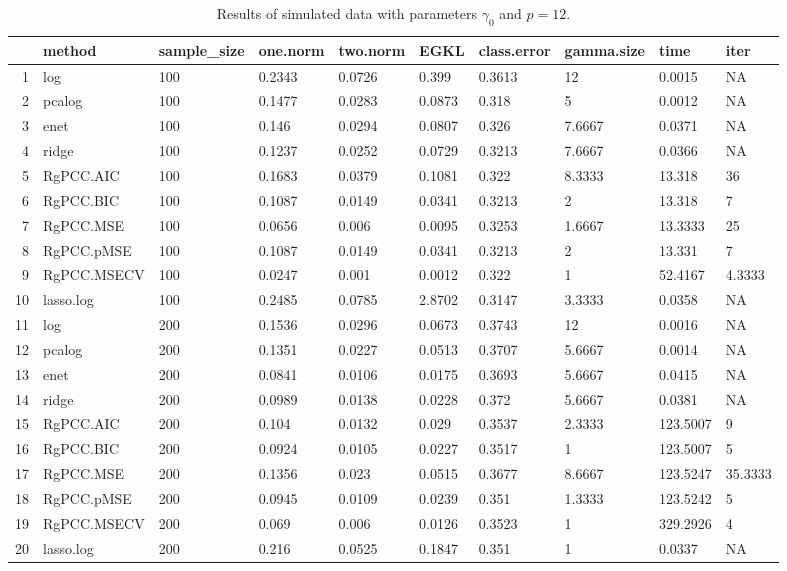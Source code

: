 \begin{table}[ht]
\centering
\begin{tabular}{rlllllllll}
  \hline
 & method & sample\_size & one.norm & two.norm & EGKL & class.error & gamma.size & time & iter \\ 
  \hline
1 & log & 100 & 0.2343 & 0.0726 & 0.399 & 0.3613 & 12 & 0.0015 & NA \\ 
  2 & pcalog & 100 & 0.1477 & 0.0283 & 0.0873 & 0.318 & 5 & 0.0012 & NA \\ 
  3 & enet & 100 & 0.146 & 0.0294 & 0.0807 & 0.326 & 7.6667 & 0.0371 & NA \\ 
  4 & ridge & 100 & 0.1237 & 0.0252 & 0.0729 & 0.3213 & 7.6667 & 0.0366 & NA \\ 
  5 & RgPCC.AIC & 100 & 0.1683 & 0.0379 & 0.1081 & 0.322 & 8.3333 & 13.318 & 36 \\ 
  6 & RgPCC.BIC & 100 & 0.1087 & 0.0149 & 0.0341 & 0.3213 & 2 & 13.318 & 7 \\ 
  7 & RgPCC.MSE & 100 & 0.0656 & 0.006 & 0.0095 & 0.3253 & 1.6667 & 13.3333 & 25 \\ 
  8 & RgPCC.pMSE & 100 & 0.1087 & 0.0149 & 0.0341 & 0.3213 & 2 & 13.331 & 7 \\ 
  9 & RgPCC.MSECV & 100 & 0.0247 & 0.001 & 0.0012 & 0.322 & 1 & 52.4167 & 4.3333 \\ 
  10 & lasso.log & 100 & 0.2485 & 0.0785 & 2.8702 & 0.3147 & 3.3333 & 0.0358 & NA \\ 
  11 & log & 200 & 0.1536 & 0.0296 & 0.0673 & 0.3743 & 12 & 0.0016 & NA \\ 
  12 & pcalog & 200 & 0.1351 & 0.0227 & 0.0513 & 0.3707 & 5.6667 & 0.0014 & NA \\ 
  13 & enet & 200 & 0.0841 & 0.0106 & 0.0175 & 0.3693 & 5.6667 & 0.0415 & NA \\ 
  14 & ridge & 200 & 0.0989 & 0.0138 & 0.0228 & 0.372 & 5.6667 & 0.0381 & NA \\ 
  15 & RgPCC.AIC & 200 & 0.104 & 0.0132 & 0.029 & 0.3537 & 2.3333 & 123.5007 & 9 \\ 
  16 & RgPCC.BIC & 200 & 0.0924 & 0.0105 & 0.0227 & 0.3517 & 1 & 123.5007 & 5 \\ 
  17 & RgPCC.MSE & 200 & 0.1356 & 0.023 & 0.0515 & 0.3677 & 8.6667 & 123.5247 & 35.3333 \\ 
  18 & RgPCC.pMSE & 200 & 0.0945 & 0.0109 & 0.0239 & 0.351 & 1.3333 & 123.5242 & 5 \\ 
  19 & RgPCC.MSECV & 200 & 0.069 & 0.006 & 0.0126 & 0.3523 & 1 & 329.2926 & 4 \\ 
  20 & lasso.log & 200 & 0.216 & 0.0525 & 0.1847 & 0.351 & 1 & 0.0337 & NA \\ 
   \hline
\end{tabular}
\caption{Results of simulated data with parameters $\gamma_0$ and $p =12$. } 
\label{fig-0-debug-new-algo-12-metrics-p}
\end{table}
